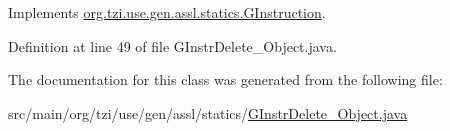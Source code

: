Implements \hyperlink{interfaceorg_1_1tzi_1_1use_1_1gen_1_1assl_1_1statics_1_1_g_instruction_a2ce478cb4d7c839fec6db330099638a9}{org.\-tzi.\-use.\-gen.\-assl.\-statics.\-G\-Instruction}.



Definition at line 49 of file G\-Instr\-Delete\-\_\-\-Object.\-java.



The documentation for this class was generated from the following file\-:\begin{DoxyCompactItemize}
\item 
src/main/org/tzi/use/gen/assl/statics/\hyperlink{_g_instr_delete___object_8java}{G\-Instr\-Delete\-\_\-\-Object.\-java}\end{DoxyCompactItemize}
